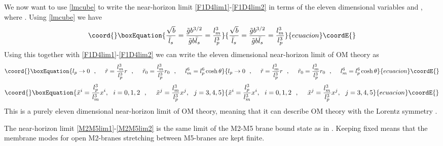 \documentclass[a4paper,twoside,titlepage,12pt]{article}
\begin{document}
We now want to use \eqref{lmcube} to write the near-horizon limit 
\eqref{F1D4lim1}-\eqref{F1D4lim2} in terms of the eleven dimensional
variables \myHighlight{\( \lm \)}\coordHE{} and \coordHE{}, where \coordHE{}.
Using \eqref{lmcube} we have 
%
\begin{equation}\coord{}\boxEquation{
\frac{\sqrt{b}}{\lsb} = \frac{\tilde{g} b^{3/2}}{\tilde{g} b \lsb}
= \frac{\lm^3}{l_p^3}
}{
\frac{\sqrt{b}}{\lsb} = \frac{\tilde{g} b^{3/2}}{\tilde{g} b \lsb}
= \frac{\lm^3}{l_p^3}
}{ecuacion}\coordE{}\end{equation}
%
Using this together with \eqref{F1D4lim1}-\eqref{F1D4lim2} 
we can write the eleven dimensional near-horizon limit of
OM theory as
%
\begin{equation}\coord{}\boxEquation{
\label{M2M5lim1}
l_p \rightarrow 0 \spa
\tilde{r} = \frac{\lm^3}{l_p^3} r \spa
\tilde{r}_0 = \frac{\lm^3}{l_p^3 } r_0 \spa
\lm^6 = l_p^6 \cosh \theta
}{
l_p \rightarrow 0 \spa
\tilde{r} = \frac{\lm^3}{l_p^3} r \spa
\tilde{r}_0 = \frac{\lm^3}{l_p^3 } r_0 \spa
\lm^6 = l_p^6 \cosh \theta
}{ecuacion}\coordE{}\end{equation}
%
\begin{equation}\coord{}\boxEquation{
\label{M2M5lim2}
\tilde{x}^i = \frac{l_p^3}{\lm^3} x^i, \ \ i=0,1,2 \spa
\tilde{x}^j = \frac{\lm^3}{l_p^3} x^j,\ \ j=3,4,5 
}{
\tilde{x}^i = \frac{l_p^3}{\lm^3} x^i, \ \ i=0,1,2 \spa
\tilde{x}^j = \frac{\lm^3}{l_p^3} x^j,\ \ j=3,4,5 
}{ecuacion}\coordE{}\end{equation}
%
This is a purely eleven dimensional near-horizon limit of
OM theory, meaning that it can describe OM theory
with the Lorentz symmetry \coordHE{}.

The near-horizon limit \eqref{M2M5lim1}-\eqref{M2M5lim2} 
is the same limit of the M2-M5 brane bound state
as in \cite{Alishahiha:1999ci,Harmark:1999rb}.
Keeping \coordHE{} fixed means that the membrane modes for open
M2-branes stretching between M5-branes are kept finite.
\end{document}
